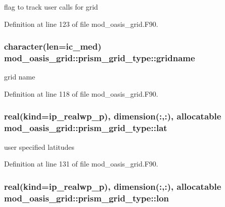 flag to track user calls for grid 



Definition at line 123 of file mod\+\_\+oasis\+\_\+grid.\+F90.

\hypertarget{structmod__oasis__grid_1_1prism__grid__type_a51bf2e1319c04ec74a7787da72a0535b}{
\subsubsection[{gridname}]{\setlength{\rightskip}{0pt plus 5cm}character(len=ic\+\_\+med) mod\+\_\+oasis\+\_\+grid\+::prism\+\_\+grid\+\_\+type\+::gridname\hspace{0.3cm}{\ttfamily [private]}}}\label{structmod__oasis__grid_1_1prism__grid__type_a51bf2e1319c04ec74a7787da72a0535b}


grid name 



Definition at line 118 of file mod\+\_\+oasis\+\_\+grid.\+F90.

\hypertarget{structmod__oasis__grid_1_1prism__grid__type_aa3a8ae208948be24ac3964c9d660afed}{
\subsubsection[{lat}]{\setlength{\rightskip}{0pt plus 5cm}real(kind=ip\+\_\+realwp\+\_\+p), dimension(\+:,\+:), allocatable mod\+\_\+oasis\+\_\+grid\+::prism\+\_\+grid\+\_\+type\+::lat\hspace{0.3cm}{\ttfamily [private]}}}\label{structmod__oasis__grid_1_1prism__grid__type_aa3a8ae208948be24ac3964c9d660afed}


user specified latitudes 



Definition at line 131 of file mod\+\_\+oasis\+\_\+grid.\+F90.

\hypertarget{structmod__oasis__grid_1_1prism__grid__type_a4f7fb8a71335506209709cfbe939ef7b}{
\subsubsection[{lon}]{\setlength{\rightskip}{0pt plus 5cm}real(kind=ip\+\_\+realwp\+\_\+p), dimension(\+:,\+:), allocatable mod\+\_\+oasis\+\_\+grid\+::prism\+\_\+grid\+\_\+type\+::lon\hspace{0.3cm}{\ttfamily [private]}}}\label{structmod__oasis__grid_1_1prism__grid__type_a4f7fb8a71335506209709cfbe939ef7b}


